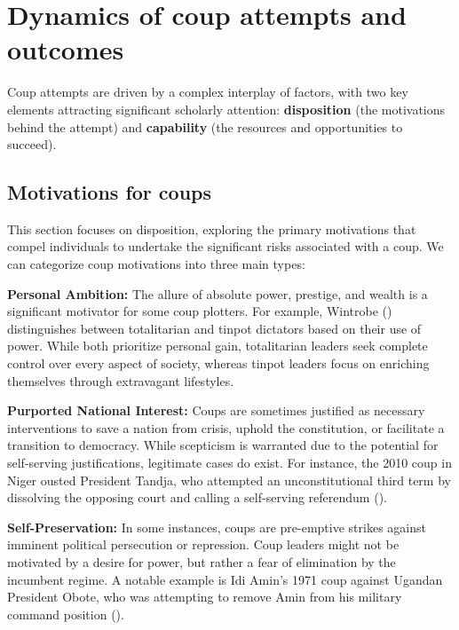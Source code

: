 \documentclass[
  12pt,
]{report}
\begin{document}
\section{Dynamics of coup attempts and
outcomes}\label{dynamics-of-coup-attempts-and-outcomes}

Coup attempts are driven by a complex interplay of factors, with two key
elements attracting significant scholarly attention:
\textbf{disposition} (the motivations behind the attempt) and
\textbf{capability} (the resources and opportunities to succeed).

\subsection{Motivations for coups}\label{motivations-for-coups}

This section focuses on disposition, exploring the primary motivations
that compel individuals to undertake the significant risks associated
with a coup. We can categorize coup motivations into three main types:

\textbf{Personal Ambition:} The allure of absolute power, prestige, and
wealth is a significant motivator for some coup plotters. For example,
Wintrobe () distinguishes between
totalitarian and tinpot dictators based on their use of power. While
both prioritize personal gain, totalitarian leaders seek complete
control over every aspect of society, whereas tinpot leaders focus on
enriching themselves through extravagant lifestyles.

\textbf{Purported National Interest:} Coups are sometimes justified as
necessary interventions to save a nation from crisis, uphold the
constitution, or facilitate a transition to democracy. While scepticism
is warranted due to the potential for self-serving justifications,
legitimate cases do exist. For instance, the 2010 coup in Niger ousted
President Tandja, who attempted an unconstitutional third term by
dissolving the opposing court and calling a self-serving referendum
().

\textbf{Self-Preservation:} In some instances, coups are pre-emptive
strikes against imminent political persecution or repression. Coup
leaders might not be motivated by a desire for power, but rather a fear
of elimination by the incumbent regime. A notable example is Idi Amin's
1971 coup against Ugandan President Obote, who was attempting to remove
Amin from his military command position
().
\end{document}
